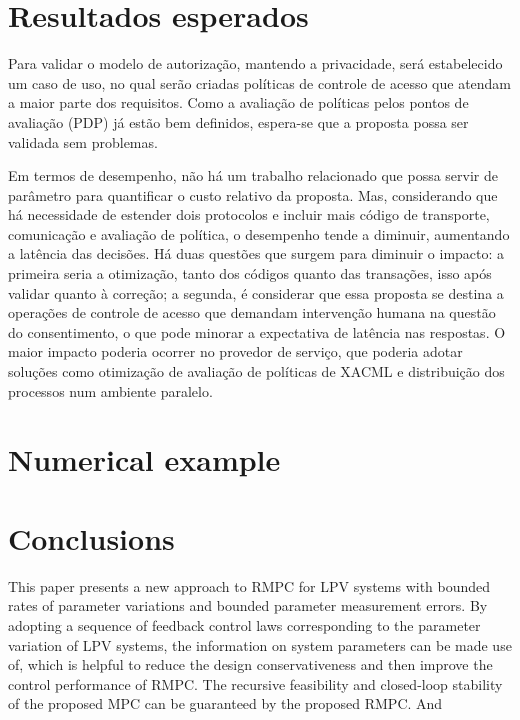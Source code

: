 \documentclass{doublecol-new}
\begin{document}
\section{Resultados esperados}\label{sec:result_esperados}

Para validar o modelo de autorização, mantendo a privacidade, será estabelecido um caso de uso, no qual serão criadas políticas de controle de acesso que atendam a maior parte dos requisitos. Como a avaliação de políticas pelos pontos de avaliação (PDP) já estão bem definidos, espera-se que a proposta possa ser validada sem problemas.

Em termos de desempenho, não há um trabalho relacionado que possa servir de parâmetro para quantificar o custo relativo da proposta. Mas, considerando que há necessidade de estender dois protocolos e incluir mais código de transporte, comunicação e avaliação de política, o desempenho tende a diminuir, aumentando a latência das decisões. Há duas questões que surgem para diminuir o impacto: a primeira seria a otimização, tanto dos códigos quanto das transações, isso após validar quanto à correção; a segunda, é considerar que essa proposta se destina a operações de controle de acesso que demandam intervenção humana na questão do consentimento, o que pode minorar a expectativa de latência nas respostas. O maior impacto poderia ocorrer no provedor de serviço, que poderia adotar soluções como otimização de avaliação de políticas de XACML \cite{mourad2014towards} e distribuição dos processos num ambiente paralelo.



\section{Numerical example}


\section{Conclusions}

This paper presents a new approach to RMPC for LPV systems with
bounded rates of parameter variations and bounded parameter
measurement errors. By adopting a sequence of feedback control laws
corresponding to the parameter variation of LPV systems, the
information on system parameters can be made use of, which is
helpful to reduce the design conservativeness and then improve the
control performance of RMPC. The recursive feasibility and
closed-loop stability of the proposed MPC can be guaranteed by the
proposed RMPC.
\cite{sinnema2014xacmlrest}
And 
\citep{sinnema2014xacmlrest}
\end{document}

